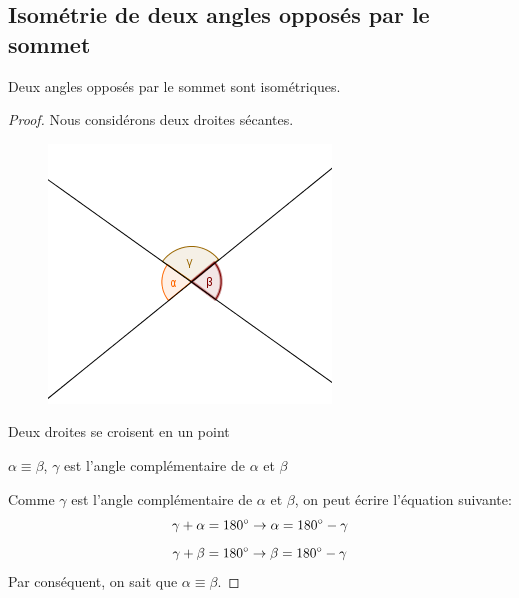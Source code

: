\documentclass[a4paper,12pt]{article}
\begin{document}
\pagebreak
\subsection{Isométrie de deux angles opposés par le sommet}
\begin{theorem}
Deux angles opposés par le sommet sont isométriques.
\end{theorem}
\begin{proof}
Nous considérons deux droites sécantes.

 \begin{figure}[H]
    \centering
    \includegraphics[scale=0.8]{schema/anglesym.PNG}
\end{figure}


\begin{hyp}
     Deux droites se croisent en un point
 \end{hyp}
 \begin{concl}
     $\alpha \equiv \beta$, $\gamma$ est l'angle complémentaire de $\alpha$ et $\beta$
 \end{concl}
 Comme $\gamma$ est l'angle complémentaire de $\alpha$ et $\beta$, on peut écrire l'équation suivante:
 \begin{equation}
 \gamma + \alpha = 180\degree \rightarrow \alpha = 180\degree-\gamma
 \end{equation}
 \begin{equation}
 \gamma+ \beta = 180\degree \rightarrow \beta = 180\degree-\gamma
 \end{equation}
 Par conséquent, on sait que $\alpha \equiv \beta$.
\end{proof}
\end{document}
